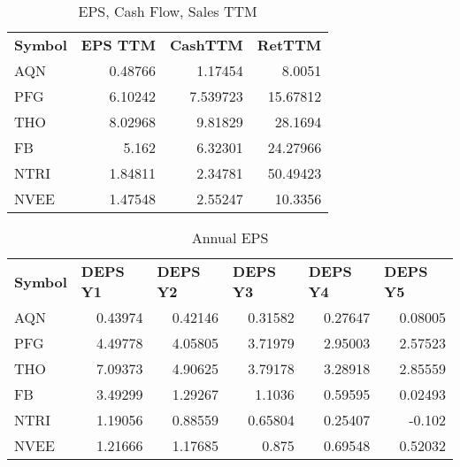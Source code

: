 \documentclass{article}
\begin{document}
\begin{table}[htbp]
  \caption{EPS, Cash Flow, Sales TTM}
   \begin{tabular}{lrrr}
    \textbf{Symbol} & \multicolumn{1}{l}{\textbf{EPS TTM}} & \multicolumn{1}{l}{\textbf{CashTTM}} & \multicolumn{1}{l}{\textbf{RetTTM}} \\
    AQN   & 0.48766 & 1.17454 & 8.0051 \\
    PFG   & 6.10242 & 7.539723 & 15.67812 \\
    THO   & 8.02968 & 9.81829 & 28.1694 \\
    FB    & 5.162 & 6.32301 & 24.27966 \\
    NTRI  & 1.84811 & 2.34781 & 50.49423 \\
    NVEE  & 1.47548 & 2.55247 & 10.3356 \\
    \end{tabular}%
  \label{tab:addlabel}%
\end{table}%

\begin{table}[htbp]
  \caption{Annual EPS}
      \begin{tabular}{lrrrrr}
    \textbf{Symbol} & \multicolumn{1}{l}{\textbf{DEPS Y1}} & \multicolumn{1}{l}{\textbf{DEPS Y2}} & \multicolumn{1}{l}{\textbf{DEPS Y3}} & \multicolumn{1}{l}{\textbf{DEPS Y4}} & \multicolumn{1}{l}{\textbf{DEPS Y5}} \\
    AQN   & 0.43974 & 0.42146 & 0.31582 & 0.27647 & 0.08005 \\
    PFG   & 4.49778 & 4.05805 & 3.71979 & 2.95003 & 2.57523 \\
    THO   & 7.09373 & 4.90625 & 3.79178 & 3.28918 & 2.85559 \\
    FB    & 3.49299 & 1.29267 & 1.1036 & 0.59595 & 0.02493 \\
    NTRI  & 1.19056 & 0.88559 & 0.65804 & 0.25407 & -0.102 \\
    NVEE  & 1.21666 & 1.17685 & 0.875 & 0.69548 & 0.52032 \\
    \end{tabular}%
  \label{tab:addlabel}%
\end{table}%
\end{document}
